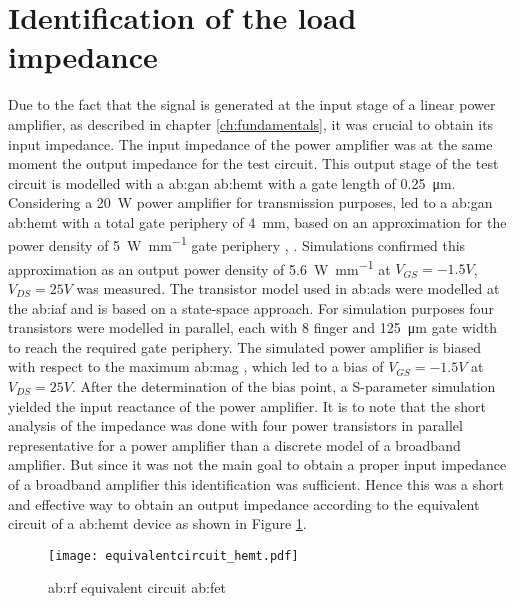 \section{Identification of the load impedance} %
Due to the fact that the signal is generated at the input stage of a linear power amplifier, as described in chapter \ref{ch:fundamentals}, it was crucial to obtain its input impedance.
The input impedance of the power amplifier was at the same moment the output impedance for the test circuit. 
This output stage of the test circuit is modelled with a \gls{ab:gan} \gls{ab:hemt} with a gate length of \SI{0.25}{\micro \meter}.
Considering a \SI{20}{\watt} power amplifier for transmission purposes, led to a \gls{ab:gan} \gls{ab:hemt} with a total gate periphery of \SI{4}{\milli \metre}, based on an approximation for the power density of \SI[per-mode=fraction]{5}{\watt\per\milli\metre} gate periphery  \cite{Maroldt2010}, \cite{GaNBook}.
Simulations confirmed this approximation as an output power density of \SI[per-mode=fraction]{5.6}{\watt\per\milli\metre} at $V_{GS} = -1.5 V$, $V_{DS} = 25 V$ was measured.
The transistor model used in \gls{ab:ads} were modelled at the \gls{ab:iaf} \cite{Model} and is based on a state-space approach. 
For simulation purposes four transistors were modelled in parallel, each with 8 finger and \SI{125}{\micro \metre} gate width to reach the required gate periphery.
The simulated power amplifier is biased with respect to the maximum \gls{ab:mag} \cite{DeltimpleLeyssenneKerherveEtAl2010}, which led to a bias of $V_{GS} = -1.5 V$ at $V_{DS} = 25 V$.
After the determination of the bias point, a S-parameter simulation yielded the input reactance of the power amplifier.
It is to note that the short analysis of the impedance was done with four power transistors in parallel representative for a power amplifier than a discrete model of a broadband amplifier.
But since it was not the main goal to obtain a proper input impedance of a broadband amplifier this identification was sufficient.
Hence this was a short and effective way to obtain an output impedance according to the equivalent circuit of a \gls{ab:hemt} device as shown in Figure \ref{fig:eqcircuit}.

\begin{figure}[H] %
	\centering
  \texttt{[image: equivalentcircuit\_hemt.pdf]}
	\caption{\gls{ab:rf} equivalent circuit \gls{ab:fet} \cite{Quay2014}}
	\label{fig:eqcircuit}
\end{figure}

